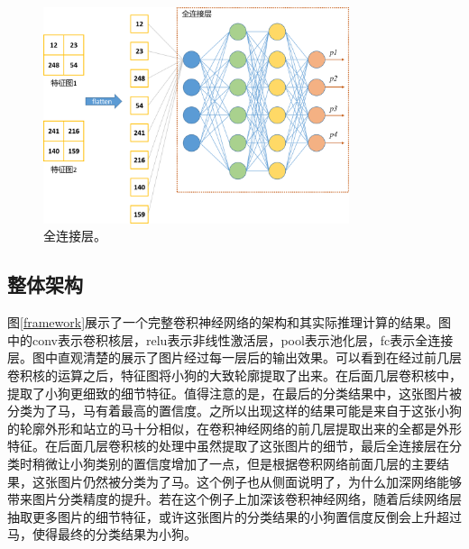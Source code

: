 \begin{figure}[ht]
	\centering
	\includegraphics[width=0.8\textwidth]{figures/fclayer.png}
	\caption{全连接层。}
	\label{fclayer}
\end{figure}

\subsection{整体架构}
图\ref{framework}展示了一个完整卷积神经网络的架构和其实际推理计算的结果。图中的conv表示卷积核层，relu表示非线性激活层，pool表示池化层，fc表示全连接层。图中直观清楚的展示了图片经过每一层后的输出效果。可以看到在经过前几层卷积核的运算之后，特征图将小狗的大致轮廓提取了出来。在后面几层卷积核中，提取了小狗更细致的细节特征。值得注意的是，在最后的分类结果中，这张图片被分类为了马，马有着最高的置信度。之所以出现这样的结果可能是来自于这张小狗的轮廓外形和站立的马十分相似，在卷积神经网络的前几层提取出来的全都是外形特征。在后面几层卷积核的处理中虽然提取了这张图片的细节，最后全连接层在分类时稍微让小狗类别的置信度增加了一点，但是根据卷积网络前面几层的主要结果，这张图片仍然被分类为了马。这个例子也从侧面说明了，为什么加深网络能够带来图片分类精度的提升。若在这个例子上加深该卷积神经网络，随着后续网络层抽取更多图片的细节特征，或许这张图片的分类结果的小狗置信度反倒会上升超过马，使得最终的分类结果为小狗。


